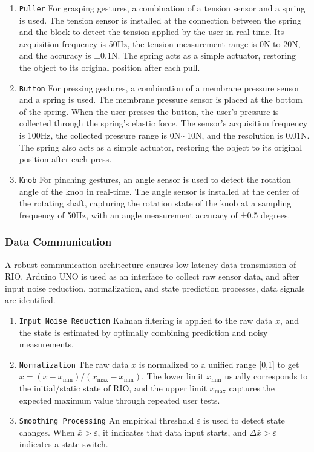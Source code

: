 \documentclass[runningheads]{llncs}
\begin{document}
\begin{enumerate}[label={\arabic*)}]
  \item \texttt{Puller} For grasping gestures, a combination of a tension sensor and a spring is used. The tension sensor is installed at the connection between the spring and the block to detect the tension applied by the user in real-time. Its acquisition frequency is 50Hz, the tension measurement range is 0N to 20N, and the accuracy is ±0.1N. The spring acts as a simple actuator, restoring the object to its original position after each pull.
  \item \texttt{Button} For pressing gestures, a combination of a membrane pressure sensor and a spring is used. The membrane pressure sensor is placed at the bottom of the spring. When the user presses the button, the user's pressure is collected through the spring's elastic force. The sensor's acquisition frequency is 100Hz, the collected pressure range is 0N\(\sim\)10N, and the resolution is 0.01N. The spring also acts as a simple actuator, restoring the object to its original position after each press.
  \item \texttt{Knob} For pinching gestures, an angle sensor is used to detect the rotation angle of the knob in real-time. The angle sensor is installed at the center of the rotating shaft, capturing the rotation state of the knob at a sampling frequency of 50Hz, with an angle measurement accuracy of ±0.5 degrees.
\end{enumerate}

\subsubsection{Data Communication}
A robust communication architecture ensures low-latency data transmission of RIO. Arduino UNO is used as an interface to collect raw sensor data, and after input noise reduction, normalization, and state prediction processes, data signals are identified.

\begin{enumerate}[label={\arabic*)}]
  \item \texttt{Input Noise Reduction} Kalman filtering is applied to the raw data \(x\), and the state is estimated by optimally combining prediction and noisy measurements.
  \item \texttt{Normalization} The raw data \(x\) is normalized to a unified range [0,1] to get \(\bar{x}=(x-x_{\min})/(x_{\max}-x_{\min})\). The lower limit \(x_{\min}\) usually corresponds to the initial/static state of RIO, and the upper limit \(x_{\max}\) captures the expected maximum value through repeated user tests.
  \item \texttt{Smoothing Processing} An empirical threshold \(\varepsilon\) is used to detect state changes. When \(\bar{x}>\varepsilon\), it indicates that data input starts, and \(\Delta\bar{x}>\varepsilon\) indicates a state switch.
\end{enumerate}
\end{document}
